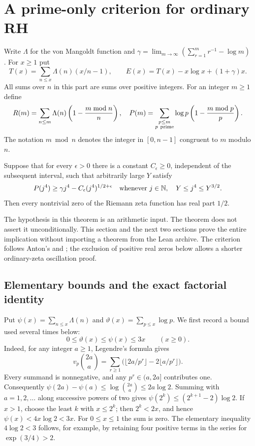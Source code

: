 \section{A prime-only criterion for ordinary RH}
\label{sec:sr-prime}
Write \(\Lambda\) for the von Mangoldt function and
\(\gamma=\lim_{m\to\infty}(\sum_{r=1}^m r^{-1}-\log m)\).
For \(x\geq1\) put
\[
 T(x)=\sum_{n\leq x}\Lambda(n)(x/n-1),\qquad
 E(x)=T(x)-x\log x+(1+\gamma)x.
\]
All sums over \(n\) in this part are sums over positive integers. For an
integer \(m\geq1\) define
\[
 R(m)=\sum_{n\leq m}\Lambda(n)\left(1-\frac{m\bmod n}{n}\right),\quad
 P(m)=\sum_{\substack{p\leq m\\p\ {\rm prime}}}
 \log p\left(1-\frac{m\bmod p}{p}\right).
\]
The notation \(m\bmod n\) denotes the integer in \([0,n-1]\) congruent to
\(m\) modulo \(n\).

\begin{srtheorem}\label{thm:sr-prime}
Suppose that for every \(\epsilon>0\) there is a constant
\(C_\epsilon\geq0\), independent of the subsequent interval, such that
arbitrarily large \(Y\) satisfy
\begin{equation}\label{eq:sr-prime}
 P(j^4)\geq\gamma j^4-C_\epsilon(j^4)^{1/2+\epsilon}
 \quad\hbox{whenever }j\in\mathbb N,\quad Y\leq j^4\leq Y^{3/2}.
\end{equation}
Then every nontrivial zero of the Riemann zeta function has real part
\(1/2\).
\end{srtheorem}
The hypothesis in this theorem is an arithmetic input. The theorem does not
assert it unconditionally. This section and the next two sections prove
the entire implication without importing a theorem from the Lean archive.
The criterion follows Anton's  and
; the exclusion of positive real zeros below
allows a shorter ordinary-zeta oscillation proof.

\subsection{Elementary bounds and the exact factorial identity}
Put \(\psi(x)=\sum_{n\leq x}\Lambda(n)\) and
\(\vartheta(x)=\sum_{p\leq x}\log p\). We first record a bound used several
times below:
\begin{equation}\label{eq:sr-cheb}
 0\leq\vartheta(x)\leq\psi(x)\leq3x\qquad(x\geq0).
\end{equation}
Indeed, for any integer \(a\geq1\), Legendre's formula gives
\[
 v_p\binom{2a}{a}=\sum_{r\geq1}
 \bigl(\lfloor2a/p^r\rfloor-2\lfloor a/p^r\rfloor\bigr).
\]
Every summand is nonnegative, and any \(p^r\in(a,2a]\) contributes one.
Consequently
\(\psi(2a)-\psi(a)\leq\log\binom{2a}{a}\leq2a\log2\).
Summing with \(a=1,2,\ldots\) along successive powers of two gives
\(\psi(2^k)\leq(2^{k+1}-2)\log2\). If \(x>1\), choose the least \(k\)
with \(x\leq2^k\); then \(2^k<2x\), and hence
\(\psi(x)<4x\log2<3x\). For \(0\leq x\leq1\) the sum is zero.
The elementary inequality \(4\log2<3\) follows, for example, by retaining
four positive terms in the series for \(\exp(3/4)>2\).

